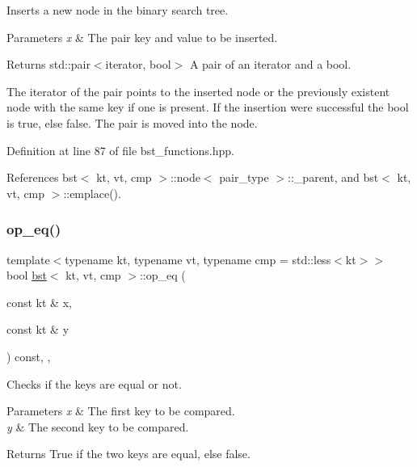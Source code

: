Inserts a new node in the binary search tree. 


\begin{DoxyParams}{Parameters}
{\em x} & The pair key and value to be inserted. \\
\hline
\end{DoxyParams}
\begin{DoxyReturn}{Returns}
std\+::pair$<$iterator, bool$>$ A pair of an iterator and a bool.
\end{DoxyReturn}
The iterator of the pair points to the inserted node or the previously existent node with the same key if one is present. If the insertion were successful the bool is true, else false. The pair is moved into the node. 

Definition at line 87 of file bst\+\_\+functions.\+hpp.



References bst$<$ kt, vt, cmp $>$\+::node$<$ pair\+\_\+type $>$\+::\+\_\+parent, and bst$<$ kt, vt, cmp $>$\+::emplace().

\mbox{\label{classbst_ad42afa310b7d0a4b4da251cd8bba6897}} 
\subsubsection{\texorpdfstring{op\+\_\+eq()}{op\_eq()}}
{\footnotesize\ttfamily template$<$typename kt, typename vt, typename cmp = std\+::less$<$kt$>$$>$ \\
bool \hyperlink{classbst}{bst}$<$ kt, vt, cmp $>$\+::op\+\_\+eq (\begin{DoxyParamCaption}\item[{const kt \&}]{x,  }\item[{const kt \&}]{y }\end{DoxyParamCaption}) const\hspace{0.3cm}{\ttfamily [inline]}, {\ttfamily [private]}, {\ttfamily [noexcept]}}



Checks if the keys are equal or not. 


\begin{DoxyParams}{Parameters}
{\em x} & The first key to be compared. \\
\hline
{\em y} & The second key to be compared. \\
\hline
\end{DoxyParams}
\begin{DoxyReturn}{Returns}
True if the two keys are equal, else false. 
\end{DoxyReturn}


